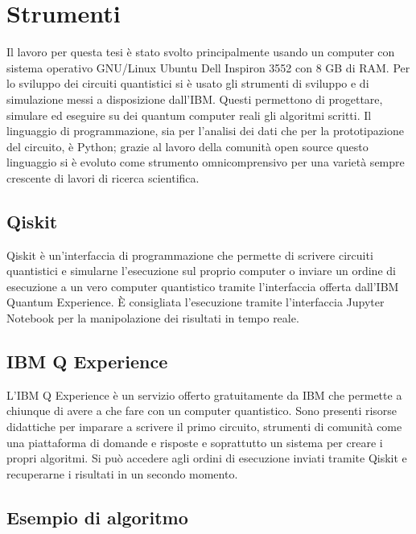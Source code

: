 \chapter{Strumenti}\label{ch:strumenti}

Il lavoro per questa tesi è stato svolto principalmente usando un computer 
con sistema operativo GNU/Linux Ubuntu Dell Inspiron 3552 con 8 GB di RAM. 
Per lo sviluppo dei circuiti quantistici si è usato gli strumenti di 
sviluppo e di simulazione messi a disposizione dall'IBM. Questi permettono 
di progettare, simulare ed eseguire su dei quantum computer reali gli 
algoritmi scritti. Il linguaggio di programmazione, sia per l'analisi 
dei dati che per la prototipazione del circuito, è Python; grazie al 
lavoro della comunità open source questo linguaggio si è evoluto 
come strumento omnicomprensivo per una varietà sempre crescente di 
lavori di ricerca scientifica. 

\section{Qiskit}

Qiskit è un'interfaccia di programmazione che permette di scrivere 
circuiti quantistici e simularne l'esecuzione sul proprio computer 
o inviare un ordine di esecuzione a un vero computer quantistico tramite 
l'interfaccia offerta dall'IBM Quantum Experience. 
È consigliata l'esecuzione tramite l'interfaccia Jupyter Notebook per 
la manipolazione dei risultati in tempo reale. 

\section{IBM Q Experience}

L'IBM Q Experience è un servizio offerto gratuitamente da IBM che permette 
a chiunque di avere a che fare con un computer quantistico. Sono presenti 
risorse didattiche per imparare a scrivere il primo circuito, strumenti 
di comunità come una piattaforma di domande e risposte e soprattutto 
un sistema per creare i propri algoritmi. Si può accedere agli ordini di 
esecuzione inviati tramite Qiskit e recuperarne i risultati in un 
secondo momento. 

\section{Esempio di algoritmo}

